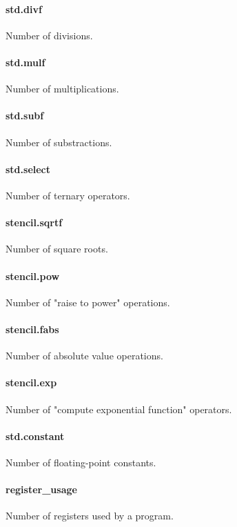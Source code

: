 \documentclass[sigplan,\review anonymous]{acmart}
\begin{document}
\paragraph{std.divf} Number of divisions.
\paragraph{std.mulf} Number of multiplications.
\paragraph{std.subf} Number of substractions.
\paragraph{std.select} Number of ternary operators.
\paragraph{stencil.sqrtf} Number of square roots.
\paragraph{stencil.pow} Number of "raise to power" operations.
\paragraph{stencil.fabs} Number of absolute value operations.
\paragraph{stencil.exp} Number of "compute exponential function"
  operators. 
\paragraph{std.constant} Number of floating-point constants.
\paragraph{register\_usage} Number of registers used by a program.
\end{document}
